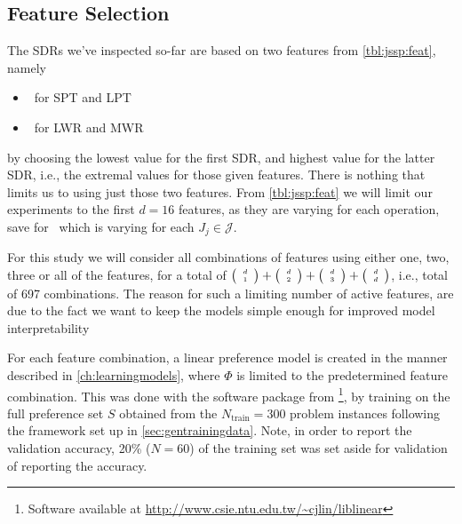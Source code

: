 \documentclass[smallextended]{svjour3}
\begin{document}
\subsection{Feature Selection}
The SDRs we've inspected so-far are based on two features from
\cref{tbl:jssp:feat}, namely
\begin{itemize}
	\item \phiproc\ for SPT and LPT 
	\item \phiwrmJob\ for LWR and MWR 
\end{itemize}
by choosing the lowest value for the first SDR, and highest value for the 
latter SDR, i.e., the extremal values for those given features. 
There is nothing that limits us to using just those two features. 
From \cref{tbl:jssp:feat} we will limit our experiments to the first $d=16$ 
features, as they are varying for each operation, save for \phitotalProc\ which 
is varying for each $J_j\in\mathcal{J}$. 

For this study we will consider all combinations of features using either one,
two, three or all of the features, for a total of
$\tiny \left(\begin{array}{c}d\\1\end{array}\right)+\tiny \left(\begin{array}{c}d\\2\end{array}\right)+\tiny \left(\begin{array}{c}d\\3\end{array}\right)+\tiny \left(\begin{array}{c}d\\d\end{array}\right)$, i.e., total
of 697 combinations. The reason for such a limiting number of active features,
are due to the fact we want to keep the models simple enough for improved model
interpretability

For each feature combination, a linear preference model is created in the
manner described in \cref{ch:learningmodels}, where $\Phi$ is limited to the
predetermined feature combination. This was done with the software package from
\cite{liblinear}\footnote{Software available at 
	\url{http://www.csie.ntu.edu.tw/~cjlin/liblinear}},
by training on the full preference set $S$ obtained from the
$N_{\text{train}}=300$ problem instances following the framework set up in
\cref{sec:gentrainingdata}. 
Note, in order to report the validation accuracy, 20\% ($N=60$) of the training 
set was set aside for validation of reporting the accuracy.
\end{document}
